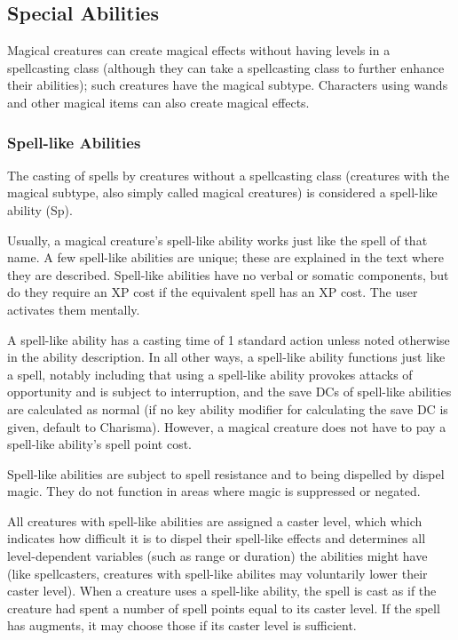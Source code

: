 \subsection{Special Abilities}
Magical creatures can create magical effects without having levels in a spellcasting class 
(although they can take a spellcasting class to further enhance their abilities); such creatures have the magical subtype.
Characters using wands and other magical items can also create magical effects.

\subsubsection{Spell-like Abilities} 
The casting of spells by creatures without a spellcasting class (creatures with the magical subtype, 
also simply called magical creatures) is considered a spell-like ability (Sp). 

Usually, a magical creature's spell-like ability works just like the spell of that name. 
A few spell-like abilities are unique; these are explained in the text where they are described.
Spell-like abilities have no verbal or somatic components, but do they require an XP cost if the equivalent spell has an XP cost. 
The user activates them mentally.

A spell-like ability has a casting time of 1 standard action unless noted otherwise in the ability description. 
In all other ways, a spell-like ability functions just like a spell, notably including that using a spell-like ability provokes attacks of opportunity and is subject to interruption, and the save DCs of spell-like abilities are calculated as normal (if no key ability modifier for calculating the save DC is given, default to Charisma). 
However, a magical creature does not have to pay a spell-like ability's spell point cost.

Spell-like abilities are subject to spell resistance and to being dispelled by dispel magic. 
They do not function in areas where magic is suppressed or negated.

All creatures with spell-like abilities are assigned a caster level, which which indicates how difficult it is to dispel their spell-like effects and determines all level-dependent variables (such as range or duration) the abilities might have (like spellcasters, creatures with spell-like abilites may voluntarily lower their caster level). 
When a creature uses a spell-like ability, the spell is cast as if the creature had spent a number of spell points equal to its caster level.
If the spell has augments, it may choose those if its caster level is sufficient.
